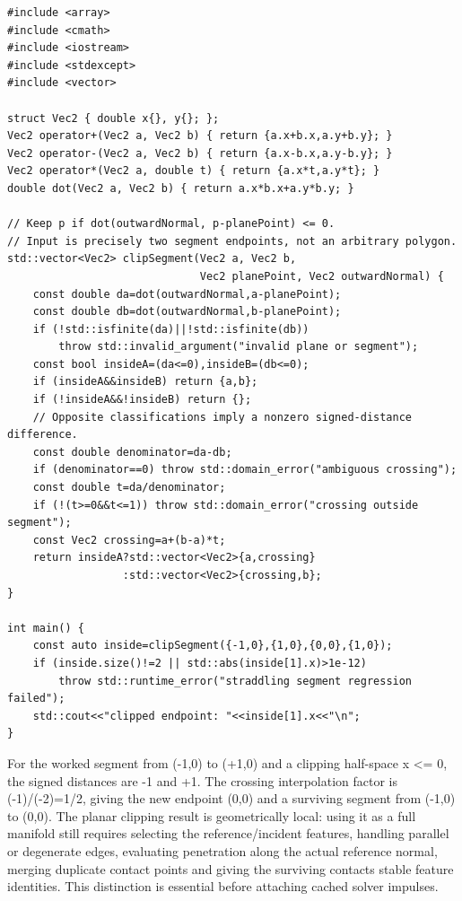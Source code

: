 \begin{verbatim}
#include <array>
#include <cmath>
#include <iostream>
#include <stdexcept>
#include <vector>

struct Vec2 { double x{}, y{}; };
Vec2 operator+(Vec2 a, Vec2 b) { return {a.x+b.x,a.y+b.y}; }
Vec2 operator-(Vec2 a, Vec2 b) { return {a.x-b.x,a.y-b.y}; }
Vec2 operator*(Vec2 a, double t) { return {a.x*t,a.y*t}; }
double dot(Vec2 a, Vec2 b) { return a.x*b.x+a.y*b.y; }

// Keep p if dot(outwardNormal, p-planePoint) <= 0.
// Input is precisely two segment endpoints, not an arbitrary polygon.
std::vector<Vec2> clipSegment(Vec2 a, Vec2 b,
                              Vec2 planePoint, Vec2 outwardNormal) {
    const double da=dot(outwardNormal,a-planePoint);
    const double db=dot(outwardNormal,b-planePoint);
    if (!std::isfinite(da)||!std::isfinite(db))
        throw std::invalid_argument("invalid plane or segment");
    const bool insideA=(da<=0),insideB=(db<=0);
    if (insideA&&insideB) return {a,b};
    if (!insideA&&!insideB) return {};
    // Opposite classifications imply a nonzero signed-distance difference.
    const double denominator=da-db;
    if (denominator==0) throw std::domain_error("ambiguous crossing");
    const double t=da/denominator;
    if (!(t>=0&&t<=1)) throw std::domain_error("crossing outside segment");
    const Vec2 crossing=a+(b-a)*t;
    return insideA?std::vector<Vec2>{a,crossing}
                  :std::vector<Vec2>{crossing,b};
}

int main() {
    const auto inside=clipSegment({-1,0},{1,0},{0,0},{1,0});
    if (inside.size()!=2 || std::abs(inside[1].x)>1e-12)
        throw std::runtime_error("straddling segment regression failed");
    std::cout<<"clipped endpoint: "<<inside[1].x<<"\n";
}
\end{verbatim}

For the worked segment from (-1,0) to (+1,0) and a clipping half-space x \textless= 0, the signed distances are -1 and +1. The crossing interpolation factor is (-1)/(-2)=1/2, giving the new endpoint (0,0) and a surviving segment from (-1,0) to (0,0). The planar clipping result is geometrically local: using it as a full manifold still requires selecting the reference/incident features, handling parallel or degenerate edges, evaluating penetration along the actual reference normal, merging duplicate contact points and giving the surviving contacts stable feature identities. This distinction is essential before attaching cached solver impulses.

